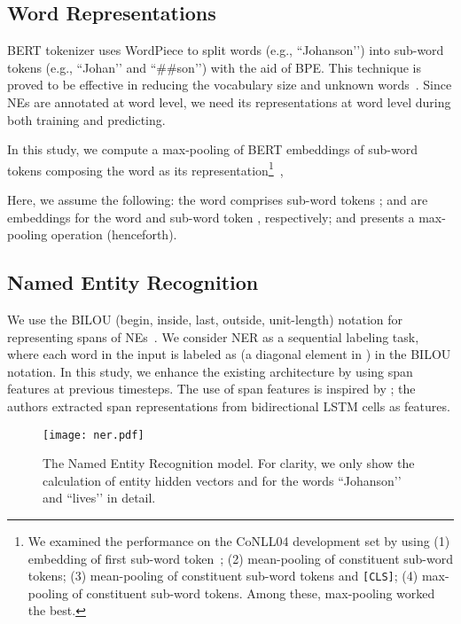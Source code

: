 \documentclass[11pt,a4paper]{article}
\begin{document}
\subsection{Word Representations}
\label{alignment}

BERT tokenizer uses WordPiece to split words (e.g., ``Johanson’’) into sub-word tokens (e.g., ``Johan’’ and ``\#\#son’’) with the aid of BPE. This technique is proved to be effective in reducing the vocabulary size and unknown words~\cite{devlin-etal-2019-bert}. Since NEs are annotated at word level, we need its representations at word level during both training and predicting.

In this study, we compute a max-pooling of BERT embeddings of sub-word tokens composing the word as its representation\footnote{We examined the performance on the CoNLL04 development set by using (1) embedding of first sub-word token~\cite{devlin-etal-2019-bert}; (2) mean-pooling of constituent sub-word tokens; (3) mean-pooling of constituent sub-word tokens and \texttt{[CLS]}; (4) max-pooling of constituent sub-word tokens. Among these, max-pooling worked the best.}~\citep{liu-etal-2019-gcdt},

Here, we assume the following: the word  comprises  sub-word tokens ;  and  are embeddings for the word  and sub-word token , respectively; and  presents a max-pooling operation (henceforth).


\subsection{Named Entity Recognition}
\label{ner}

We use the BILOU (begin, inside, last, outside, unit-length) notation for representing spans of NEs~\cite{ratinov-roth-2009-design}.
We consider NER as a sequential labeling task, where each word  in the input is labeled as  (a diagonal element in ) in the BILOU notation.
In this study, we enhance the existing architecture by using span features at previous timesteps. The use of span features is inspired by \citet{zhang-etal-2017-end}; the authors extracted span representations from bidirectional LSTM cells as features.

    \begin{figure}[t]
     \texttt{[image: ner.pdf]}
     \caption{The Named Entity Recognition model. For clarity, we only show the calculation of entity hidden vectors  and  for the words ``Johanson’’ and ``lives’’ in detail.}
    \label{fig:ner}
    \end{figure}
\end{document}

